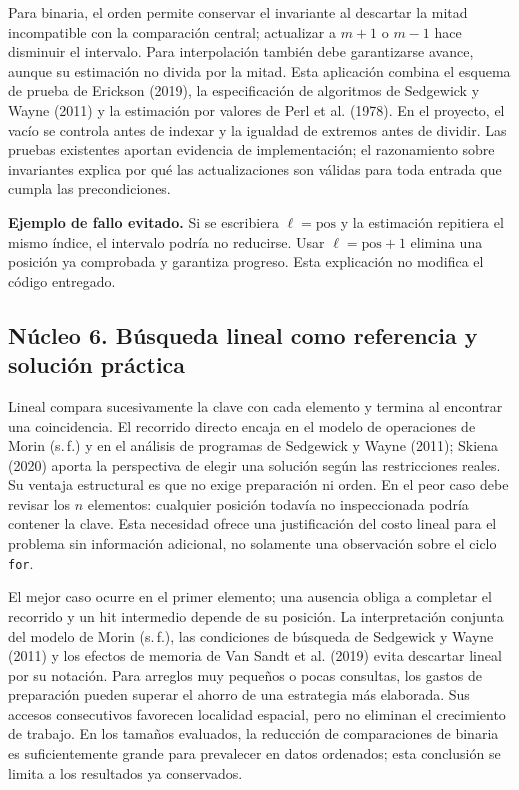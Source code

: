 Para binaria, el orden permite conservar el invariante al descartar la mitad incompatible con la comparación central; actualizar a $m+1$ o $m-1$ hace disminuir el intervalo. Para interpolación también debe garantizarse avance, aunque su estimación no divida por la mitad. Esta aplicación combina el esquema de prueba de Erickson (2019), la especificación de algoritmos de Sedgewick y Wayne (2011) y la estimación por valores de Perl et al. (1978). En el proyecto, el vacío se controla antes de indexar y la igualdad de extremos antes de dividir. Las pruebas existentes aportan evidencia de implementación; el razonamiento sobre invariantes explica por qué las actualizaciones son válidas para toda entrada que cumpla las precondiciones.

\textbf{Ejemplo de fallo evitado.} Si se escribiera $\ell=\text{pos}$ y la estimación repitiera el mismo índice, el intervalo podría no reducirse. Usar $\ell=\text{pos}+1$ elimina una posición ya comprobada y garantiza progreso. Esta explicación no modifica el código entregado.

\subsection{Núcleo 6. Búsqueda lineal como referencia y solución práctica}
Lineal compara sucesivamente la clave con cada elemento y termina al encontrar una coincidencia. El recorrido directo encaja en el modelo de operaciones de Morin (s.\,f.) y en el análisis de programas de Sedgewick y Wayne (2011); Skiena (2020) aporta la perspectiva de elegir una solución según las restricciones reales. Su ventaja estructural es que no exige preparación ni orden. En el peor caso debe revisar los $n$ elementos: cualquier posición todavía no inspeccionada podría contener la clave. Esta necesidad ofrece una justificación del costo lineal para el problema sin información adicional, no solamente una observación sobre el ciclo \texttt{for}.

El mejor caso ocurre en el primer elemento; una ausencia obliga a completar el recorrido y un hit intermedio depende de su posición. La interpretación conjunta del modelo de Morin (s.\,f.), las condiciones de búsqueda de Sedgewick y Wayne (2011) y los efectos de memoria de Van Sandt et al. (2019) evita descartar lineal por su notación. Para arreglos muy pequeños o pocas consultas, los gastos de preparación pueden superar el ahorro de una estrategia más elaborada. Sus accesos consecutivos favorecen localidad espacial, pero no eliminan el crecimiento de trabajo. En los tamaños evaluados, la reducción de comparaciones de binaria es suficientemente grande para prevalecer en datos ordenados; esta conclusión se limita a los resultados ya conservados.

